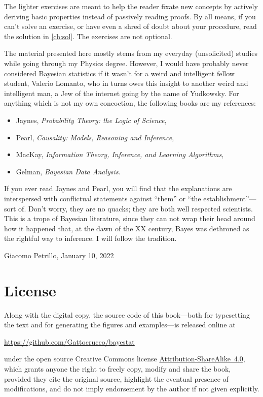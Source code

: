 The lighter exercises are meant to help the reader fixate new concepts by
actively deriving basic properties instead of passively reading proofs. By all
means, if you can't solve an exercise, or have even a shred of doubt about your
procedure, read the solution in \autoref{ch:sol}. The exercises are not
optional.

The material presented here mostly stems from my everyday (unsolicited) studies
while going through my Physics degree. However, I would have probably never
considered Bayesian statistics if it wasn't for a weird and intelligent fellow
student, Valerio Lomanto, who in turns owes this insight to another weird and
intelligent man, a Jew of the internet going by the name of Yudkowsky. For
anything which is not my own concoction, the following books are my references:
%
\begin{itemize}
    \item Jaynes, \emph{Probability Theory: the Logic of Science},
    \item Pearl, \emph{Causality: Models, Reasoning and Inference},
    \item MacKay, \emph{Information Theory, Inference, and Learning Algorithms},
    \item Gelman, \emph{Bayesian Data Analysis}.
\end{itemize}
%
If you ever read Jaynes and Pearl, you will find that the explanations are
interspersed with conflictual statements against ``them'' or ``the
establishment''---sort of. Don't worry, they are no quacks; they are both well
respected scientists. This is a trope of Bayesian literature, since they can
not wrap their head around how it happened that, at the dawn of the XX century,
Bayes was dethroned as the rightful way to inference. I will follow the
tradition.
%
\begin{flushright}
    Giacomo Petrillo, January 10, 2022
\end{flushright}

\section*{License}

Along with the digital copy, the source code of this book---both for
typesetting the text and for generating the figures and examples---is released
online at
%
\begin{center}
    \url{https://github.com/Gattocrucco/bayestat}
\end{center}
%
under the open source Creative Commons license
\href{https://creativecommons.org/licenses/by-sa/4.0/}{Attribution-ShareAlike~4.0},
which grants anyone the right to freely copy, modify and share the book,
provided they cite the original source, highlight the eventual presence of
modifications, and do not imply endorsement by the author if not given
explicitly.
